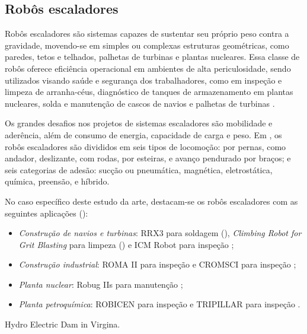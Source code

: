 \subsection{Robôs escaladores}
Robôs escaladores são sistemas capazes de sustentar seu próprio peso contra a
gravidade, movendo-se em simples ou complexas estruturas geométricas, como
paredes, tetos e telhados, palhetas de turbinas e plantas nucleares.
Essa classe de robôs oferece eficiência operacional em ambientes
de alta periculosidade, sendo utilizados visando saúde e segurança dos
trabalhadores, como em inspeção e limpeza de arranha-céus, diagnóstico de
tanques de armazenamento em plantas nucleares, solda e manutenção de cascos de
navios e palhetas de turbinas \cite{clawar}.

Os grandes desafios nos projetos de sistemas escaladores são mobilidade e
aderência, além de consumo de energia, capacidade de carga e peso. Em
\cite{modular}, os robôs escaladores são divididos em seis tipos de locomoção:
por pernas, como andador, deslizante, com rodas, por esteiras, e avanço
pendurado por braços; e seis categorias de adesão: sucção ou pneumática,
magnética, eletrostática, química, preensão, e híbrido. 

No caso específico deste estudo da arte, destacam-se os robôs escaladores com as
seguintes aplicações (\cite{climbsurv}):

\begin{itemize}
  \item \emph{Construção de navios e turbinas}: RRX3 para soldagem
  (\cite{rrx3}), \emph{Climbing Robot for Grit Blasting} para limpeza
  (\cite{crgb}) e ICM Robot para inspeção \citep{icm};
  \item \emph{Construção industrial}: ROMA II para inspeção \citep{roma} e
  CROMSCI para inspeção \citep{CROMSCI};
 \item \emph{Planta nuclear}: Robug IIs para manutenção \citep{robug}; 
 \item \emph{Planta petroquímica}: ROBICEN para inspeção \citep{robicen} e
  TRIPILLAR para inspeção \citep{tripillar}.  
\end{itemize}


 Hydro Electric Dam in Virgina.
